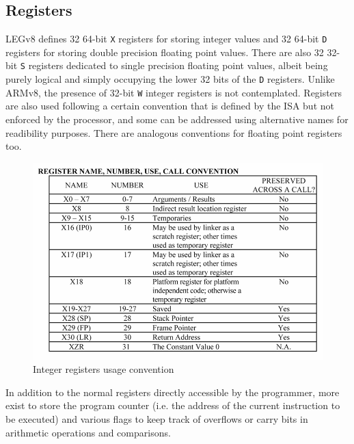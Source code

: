 \subsection*{Registers}
LEGv8 defines 32 64-bit \verb|X| registers for storing integer values and 32 64-bit \verb|D| registers for storing double precision floating point values. There are also 32 32-bit \verb|S| registers dedicated to single precision floating point values, albeit being purely logical and simply occupying the lower 32 bits of the \verb|D| registers. Unlike ARMv8, the presence of 32-bit \verb|W| integer registers is not contemplated.
\newline
Registers are also used following a certain convention that is defined by the ISA but not enforced by the processor, and some can be addressed using alternative names for readibility purposes. There are analogous conventions for floating point registers too.
\begin{figure}[H]
	\centering
	\includegraphics[width=.8\textwidth]{img/registers_conventions.png}
	\caption{Integer registers usage convention}
\end{figure}

In addition to the normal registers directly accessible by the programmer, more exist to store the program counter (i.e. the address of the current instruction to be executed) and various flags to keep track of overflows or carry bits in arithmetic operations and comparisons.

